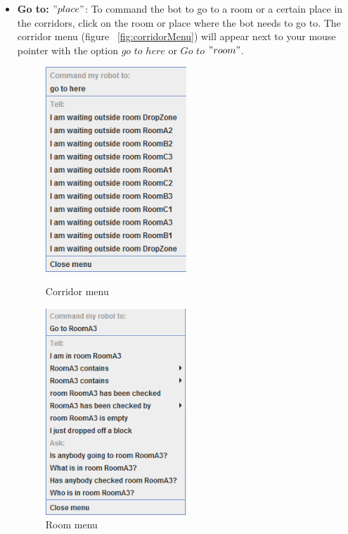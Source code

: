 \begin{itemize}

\item \textbf{Go to: $"place"$}:
To command the bot to go to a room or a certain place in the corridors, click on the room or place where the bot needs to go to. The corridor menu (figure ~\ref{fig:corridorMenu}) will appear next to your mouse pointer with the option $go$ $to$ $here$ or $Go$ $to$ $"room"$.\\

\begin{figure}[h]
\centering
\begin{minipage}{0.48\textwidth}
	\centering
	\includegraphics[width=0.5\textwidth]{HumanPlayerGUI/hpg-corridor-menu.png}
	\caption{Corridor menu}
	\label{fig:corridorMenu}
\end{minipage}\hfill
\begin{minipage}{0.48\textwidth}
	\centering
	\includegraphics[width=0.5\textwidth]{HumanPlayerGUI/hpg-room-menu.png}
	\caption{Room menu}
	\label{fig:roomMenu}
\end{minipage}
\end{figure}



\end{itemize}
